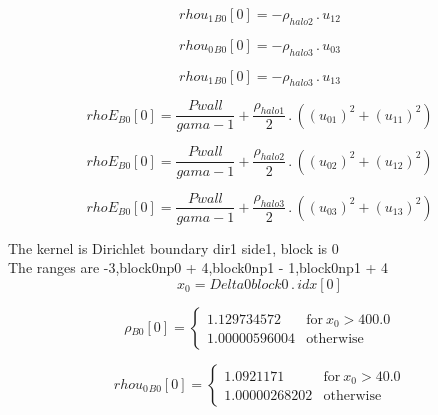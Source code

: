 \documentclass{article}
\begin{document}
\begin{dmath}{rhou_{1}{_{B0}}}[{0}] = - \rho_{halo 2} \,.\, u_{12}\end{dmath}

\begin{dmath}{rhou_{0}{_{B0}}}[{0}] = - \rho_{halo 3} \,.\, u_{03}\end{dmath}

\begin{dmath}{rhou_{1}{_{B0}}}[{0}] = - \rho_{halo 3} \,.\, u_{13}\end{dmath}

\begin{dmath}{rhoE{_{B0}}}[{0}] = \frac{Pwall}{gama - 1} + \frac{\rho_{halo 1}}{2} \,.\, \left(\left(u_{01} \right)^{2} + \left(u_{11} \right)^{2}\right)\end{dmath}

\begin{dmath}{rhoE{_{B0}}}[{0}] = \frac{Pwall}{gama - 1} + \frac{\rho_{halo 2}}{2} \,.\, \left(\left(u_{02} \right)^{2} + \left(u_{12} \right)^{2}\right)\end{dmath}

\begin{dmath}{rhoE{_{B0}}}[{0}] = \frac{Pwall}{gama - 1} + \frac{\rho_{halo 3}}{2} \,.\, \left(\left(u_{03} \right)^{2} + \left(u_{13} \right)^{2}\right)\end{dmath}

\noindent The kernel is Dirichlet boundary dir1 side1, block is 0\\\noindent The ranges are -3,block0np0 + 4,block0np1 - 1,block0np1 + 4\\\begin{dmath}x_{0} = Delta0block0 \,.\, {idx}[{0}]\end{dmath}

\begin{dmath}{\rho{_{B0}}}[{0}] = \begin{cases} 1.129734572 & \text{for}\: x_{0} > 400.0 \\1.00000596004 & \text{otherwise} \end{cases}\end{dmath}

\begin{dmath}{rhou_{0}{_{B0}}}[{0}] = \begin{cases} 1.0921171 & \text{for}\: x_{0} > 40.0 \\1.00000268202 & \text{otherwise} \end{cases}\end{dmath}
\end{document}
